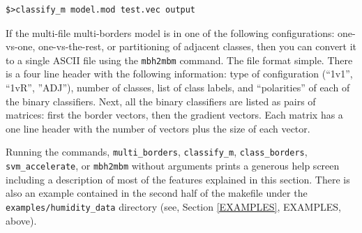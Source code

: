 \documentclass[12pt]{article}
\begin{document}
\begin{verbatim}
$>classify_m model.mod test.vec output
\end{verbatim}

If the multi-file multi-borders model is in one of the following configurations:
one-vs-one, one-vs-the-rest, or partitioning of adjacent classes, then you
can convert it to a single ASCII file using the \verb/mbh2mbm/ command.
The file format simple. There is a four line header with the 
following information: type of configuration (``1v1'', ``1vR'', ''ADJ''),
number of classes,
list of class labels, and
``polarities'' of each of the binary classifiers.
Next, all the binary classifiers are listed as pairs of matrices: 
first the border vectors, then the gradient vectors. 
Each matrix has a one line header with the number of vectors plus the size of each vector.

Running the commands, \verb"multi_borders", \verb"classify_m", \verb"class_borders", \verb/svm_accelerate/, or \verb/mbh2mbm/ without arguments prints a generous help screen including a description of most of the features explained in this section.  There is also an example contained in the second half of the makefile under the \verb"examples/humidity_data" directory (see, Section \ref{EXAMPLES}, EXAMPLES, above).

\nocite{Kohonen2000}
\nocite{Michie_etal1994}
\nocite{Terrell_Scott1992}
\nocite{Mills2014}
\nocite{Mueller_etal2001}


\end{document}

